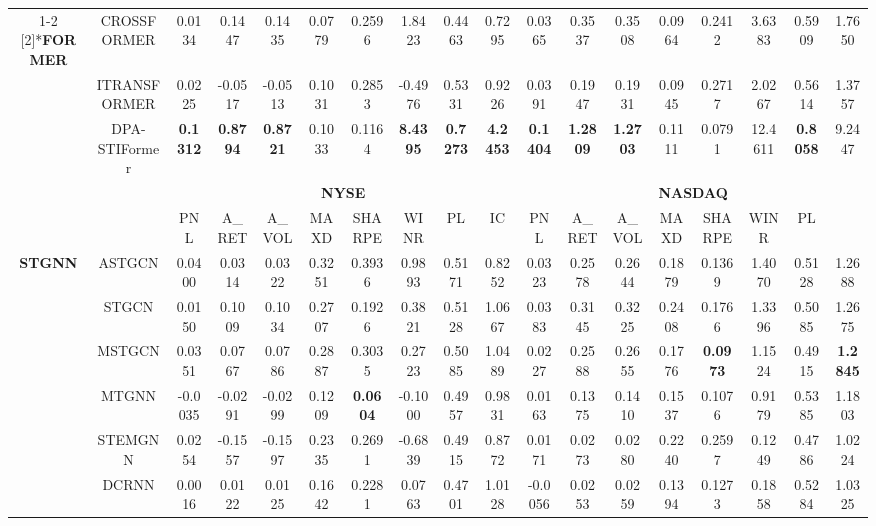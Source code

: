 \begin{table*}[htbp]
{{\begin{tabular}{cc|cccccccc|cccccccc}
\cmidrule{1-2}    \multirow{2}[2]{*}{\textbf{FORMER}} & CROSSFORMER & 0.0134  & 0.1447  & 0.1435  & 0.0779  & 0.2596  & 1.8423  & 0.4463  & 0.7295  & 0.0365  & 0.3537  & 0.3508  & 0.0964  & 0.2412  & 3.6383  & 0.5909  & 1.7650  \\
          & ITRANSFORMER & 0.0225  & -0.0517  & -0.0513  & 0.1031  & 0.2853  & -0.4976  & 0.5331  & 0.9226  & 0.0391  & 0.1947  & 0.1931  & 0.0945  & 0.2717  & 2.0267  & 0.5614  & 1.3757  \\
    \midrule
          & DPA-STIFormer    & \textbf{0.1312 } & \textbf{0.8794 } & \textbf{0.8721 } & 0.1033  & 0.1164  & \textbf{8.4395 } & \textbf{0.7273 } & \textbf{4.2453 } & \textbf{0.1404 } & \textbf{1.2809 } & \textbf{1.2703 } & 0.1111  & 0.0791  & 12.4611  & \textbf{0.8058 } & 9.2447  \\
    \midrule
    \multicolumn{2}{c|}{\multirow{2}[4]{*}{}} & \multicolumn{8}{c|}{\textbf{NYSE}}                            & \multicolumn{8}{c}{\textbf{NASDAQ}} \\
\cmidrule{3-18}    \multicolumn{2}{c|}{} & IC    & PNL   & A\_RET & A\_VOL & MAXD  & SHARPE & WINR  & PL    & IC    & PNL   & A\_RET & A\_VOL & MAXD  & SHARPE & WINR  & PL \\
    \midrule
    \multirow{6}[2]{*}{\textbf{STGNN}} & ASTGCN & 0.0400  & 0.0314  & 0.0322  & 0.3251  & 0.3936  & 0.9893  & 0.5171  & 0.8252  & 0.0323  & 0.2578  & 0.2644  & 0.1879  & 0.1369  & 1.4070  & 0.5128  & 1.2688  \\
          & STGCN & 0.0150  & 0.1009  & 0.1034  & 0.2707  & 0.1926  & 0.3821  & 0.5128  & 1.0667  & 0.0383  & 0.3145  & 0.3225  & 0.2408  & 0.1766  & 1.3396  & 0.5085  & 1.2675  \\
          & MSTGCN & 0.0351  & 0.0767  & 0.0786  & 0.2887  & 0.3035  & 0.2723  & 0.5085  & 1.0489  & 0.0227  & 0.2588  & 0.2655  & 0.1776  & \textbf{0.0973 } & 1.1524  & 0.4915  & \textbf{1.2845 } \\
          & MTGNN & -0.0035  & -0.0291  & -0.0299  & 0.1209  & \textbf{0.0604 } & -0.1000  & 0.4957  & 0.9831  & 0.0163  & 0.1375  & 0.1410  & 0.1537  & 0.1076  & 0.9179  & 0.5385  & 1.1803  \\
          & STEMGNN & 0.0254  & -0.1557  & -0.1597  & 0.2335  & 0.2691  & -0.6839  & 0.4915  & 0.8772  & 0.0171  & 0.0273  & 0.0280  & 0.2240  & 0.2597  & 0.1249  & 0.4786  & 1.0224  \\
          & DCRNN & 0.0016  & 0.0122  & 0.0125  & 0.1642  & 0.2281  & 0.0763  & 0.4701  & 1.0128  & -0.0056  & 0.0253  & 0.0259  & 0.1394  & 0.1273  & 0.1858  & 0.5284  & 1.0325  \\

\end{tabular}}}
\end{table*}
